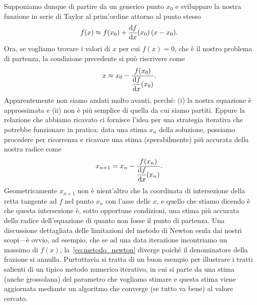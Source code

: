 
Supponiamo dunque di partire da un generico punto $x_0$ e sviluppare la
nostra funzione in serie di Taylor al prim'ordine attorno al punto stesso
\begin{align*}
  f(x) \approx f(x_0) + \td{f}{x}{x_0} (x - x_0).
\end{align*}
Ora, se vogliamo trovare i valori di $x$ per cui $f(x) = 0$, che è il nostro
problema di partenza, la condizione precedente si può riscrivere come
\begin{align*}
  x \approx x_0 - \frac{f(x_0)}{\td{f}{x}{x_0}}.
\end{align*}
Apparentemente non siamo andati molto avanti, perché: (i) la nostra equazione
è approssimata e (ii) non è più semplice di quella da cui siamo partiti.
Eppure la relazione che abbiamo ricavato ci fornisce l'idea per una strategia
iterativa che potrebbe funzionare in pratica: data una stima $x_n$ della
soluzione, possiamo procedere per ricorrenza e ricavare una stima
(sperabilmente) più accurata della nostra radice come
\begin{align}\label{eq:metodo_newton}
  x_{n+1} = x_n - \frac{f(x_n)}{\td{f}{x}{x_n}}.
\end{align}
Geometricamente $x_{n + 1}$ non è nient'altro che la coordinata di intersezione
della retta tangente ad $f$ nel punto $x_n$ con l'asse delle $x$, e quello che
stiamo dicendo è che questa intersezione è, sotto opportune condizioni, una
stima più accurata della radice dell'equazione di quanto non fosse il punto di
partenza. Una discussione dettagliata delle limitazioni del metodo di Newton
esula dai nostri scopi---è ovvio, ad esempio, che se ad una data iterazione
incontriamo un massimo di $f(x)$, la~\eqref{eq:metodo_newton} diverge poiché
il denominatore della frazione si annulla. Purtuttavia si tratta di un buon
esempio per illustrare i tratti salienti di un tipico metodo numerico iterativo,
in cui si parte da una stima (anche grossolana) del parametro che vogliamo
stimare e questa stima viene aggiornata mediante un algoritmo che converge (se
tutto va bene) al valore cercato.

